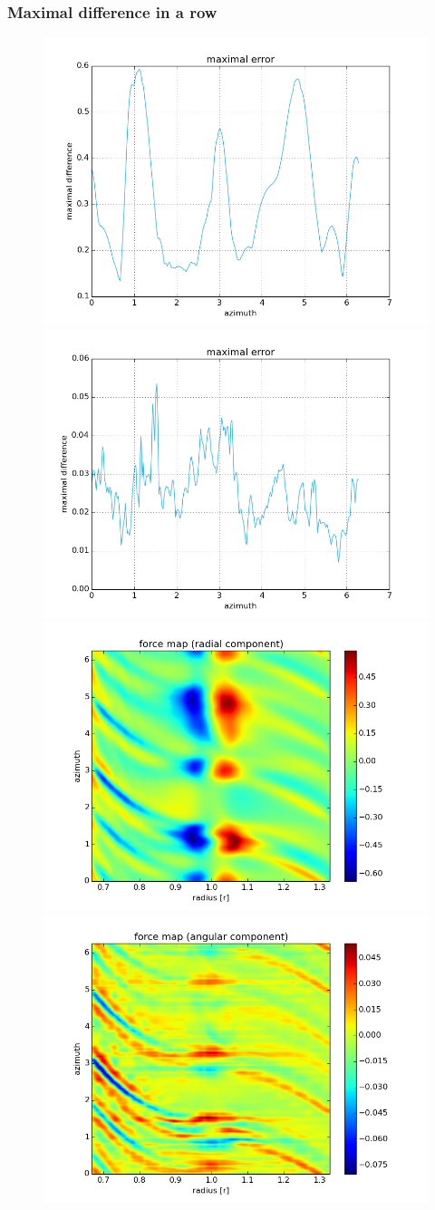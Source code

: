 \documentclass{beamer}
\begin{document}
\begin{frame}
 \frametitle{Maximal difference in a row}
 \begin{figure}[H]
  \centering
  \includegraphics[width=.4\textwidth]{radial_refined_error3.png} \includegraphics[width=.4\textwidth]{angular_refined_error3.png} \\
  \includegraphics[width=.4\textwidth]{radial_refined_diff3.png} \includegraphics[width=.4\textwidth]{angular_refined_diff3.png}
\end{figure}
\end{frame}
\end{document}
